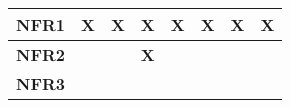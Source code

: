 \begin{table}[ht]
\begin{tabular}{|l|r|r|r|r|r|r|r|}
    \hline
    \textbf{NFR1} & \multicolumn{1}{l|}{\textbf{X}} & \multicolumn{1}{l|}{\textbf{X}} & \multicolumn{1}{l|}{\textbf{X}} & \multicolumn{1}{l|}{\textbf{X}} & \multicolumn{1}{l|}{\textbf{X}} & \multicolumn{1}{l|}{\textbf{X}} & \multicolumn{1}{l|}{\textbf{X}} \bigstrut\\
    \hline
    \textbf{NFR2} &       &       & \multicolumn{1}{l|}{\textbf{X}} &       &       &       &  \bigstrut\\
    \hline
    \textbf{NFR3} &       &       &       &       &       &       &  \bigstrut\\
    \hline
    \end{tabular}%
  \label{tab:requirements_use_case_traceability_matrix}%
\end{table}%
